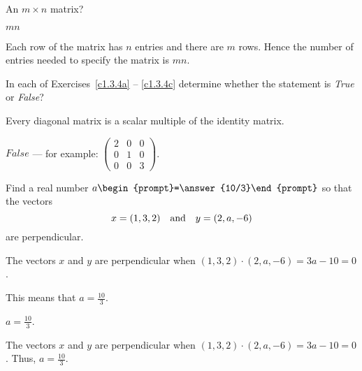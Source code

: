 \documentclass{article}
\begin{document}



\problemlabel

\begin{exercise}  \label{c1.3.2}
An $m\times n$ matrix?

\begin{solution}
\ans $mn$

\soln Each row of the matrix has $n$ entries and there are $m$ rows.  Hence the number of entries needed to specify the matrix is $mn$.

\end{solution}
\end{exercise}





\problemlabel

\noindent In each of Exercises~\ref{c1.3.4a} -- \ref{c1.3.4c} determine
whether the statement is {\em True\/} or {\em False\/}?


\begin{exercise} \label{c1.3.4b}
  Every diagonal matrix is a scalar multiple of the identity matrix.

\begin{solution}
\ans $False$ --- for example:
$\left(\begin{array}{ccc}
2 & 0 & 0 \\
0 & 1 & 0 \\
0 & 0 & 3 \end{array}\right)$.

\end{solution}
\end{exercise}





\problemlabel

\begin{exercise} \label{c1.4.2}
Find a real number $a\begin{prompt}=\answer{10/3}\end{prompt}$ so that the vectors
\[
x = (1,3,2) \quad\mbox{and}\quad y = (2,a,-6)
\]
are perpendicular.
\begin{hint}
  The vectors $x$ and $y$ are perpendicular when
$(1,3,2) \cdot (2,a,-6) = 3a - 10 = 0$.
\end{hint}
\begin{hint}
  This means that $a = \frac{10}{3}$.
\end{hint}

\begin{solution}
\ans $a = \frac{10}{3}$.

\soln The vectors $x$ and $y$ are perpendicular when $(1,3,2) \cdot (2,a,-6) = 3a - 10 = 0$.  Thus, $a = \frac{10}{3}$.

\end{solution}
\end{exercise}
\end{document}

